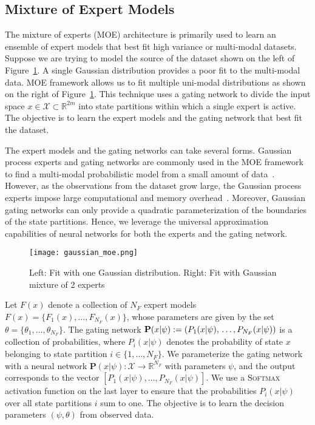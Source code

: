 \subsection{Mixture of Expert Models}
\label{ssec:mixture_of_experts}

The mixture of experts (MOE) architecture is primarily used to learn an ensemble
of expert models that best fit high variance or multi-modal datasets.
%
Suppose we are trying to model the source of the dataset shown on the left of
Figure~\ref{fig:gaussian_moe}.
%
A single Gaussian distribution provides a poor fit to the multi-modal data.
%
MOE framework allows us to fit multiple uni-modal distributions as shown on
the right of Figure~\ref{fig:gaussian_moe}.
%
This technique uses a gating network to divide the input space $x \in
\mathcal{X} \subset \mathbb{R}^{2m}$ into state partitions within which a single
expert is active.
%
The objective is to learn the expert models and the gating network that
best fit the dataset.
%

The expert models and the gating networks can take several forms. 
%
Gaussian process experts and gating networks are commonly used in the MOE
framework to find a multi-modal probabilistic model from a small amount of
data~\cite{bishop2006pattern}.
%
However, as the observations from the dataset grow large, the Gaussian process
experts impose large computational and memory
overhead~\cite{harkonen2022mixtures}.
%
Moreover, Gaussian gating networks can only provide a quadratic parameterization
of the boundaries of the state partitions.
%
Hence, we leverage the universal approximation capabilities of neural networks
for both the experts and the gating network.
%

\begin{figure}[tb]
  \centering
  \texttt{[image: gaussian\_moe.png]}
  \caption{Left: Fit with one Gaussian distribution. Right: Fit with Gaussian
  mixture of 2 experts~\cite{mcgonagle_dobre_pilling}}
  \label{fig:gaussian_moe}
\end{figure}

Let $F(x)$ denote a collection of $N_F$ expert models $F(x) = \{F_1(x),
\dots, F_{N_{F}}(x)\}$, whose parameters are given by the set
$\theta=\{\theta_1, \dots, \theta_{N_{F}} \}$.
%
%
The gating network $\mathbf{P}(x| \psi) := (P_1(x| \psi), \\ \dots, P_{N_F}(x|
\psi))$ is a collection of probabilities, where $P_i(x | \psi)$ denotes the
probability of state $x$ belonging to state partition $i \in \{1, \dots, N_F \}$. 
%
We parameterize the gating network with a neural network $\mathbf{P}(x| \psi) :
\mathcal{X} \rightarrow \mathbb{R}^{N_F}$ with parameters $\psi$, and the output
corresponds to the vector $[P_1(x| \psi), \dots, P_{N_F}(x| \psi)]$.
%
We use a \textsc{Softmax} activation function on the last layer to ensure that the
probabilities $P_i(x | \psi)$ over all state partitions $i$ sum to one.
%
The objective is to learn the decision parameters $(\psi, \theta)$ from observed
data.

